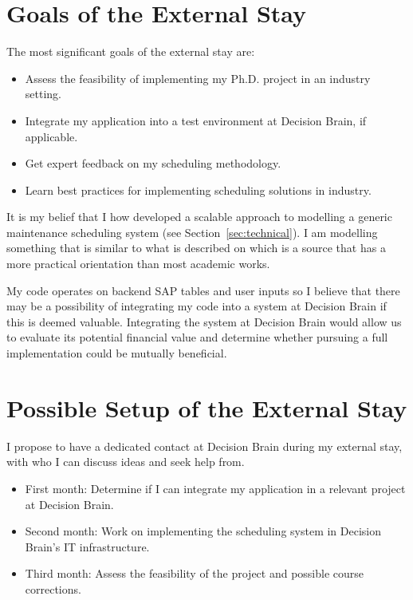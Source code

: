 \section*{Goals of the External Stay}
The most significant goals of the external stay are:

\begin{itemize}
	\item Assess the feasibility of implementing my Ph.D. project in an industry setting.
	\item Integrate my application into a test environment at Decision Brain, if applicable.
	\item Get expert feedback on my scheduling methodology. 
	\item Learn best practices for implementing scheduling solutions in industry.
\end{itemize}

It is my belief that I how developed a scalable approach to modelling a generic 
maintenance scheduling system (see Section~\ref{sec:technical}). I am 
modelling something that is similar to what is described on \cite{palmerMaintenancePlanningScheduling2019} 
which is a source that has a more practical orientation than most academic works. 

My code operates on backend SAP tables and user inputs so I believe that there may be a possibility of integrating my 
code into a system at Decision Brain if this is deemed valuable. Integrating the system at Decision 
Brain would allow us to evaluate its potential financial value and determine whether pursuing a
full implementation could be mutually beneficial.

\section*{Possible Setup of the External Stay}
I propose to have a dedicated contact at Decision Brain during my external stay, with who I can discuss ideas and seek help from.

\begin{itemize}
	\item First month: Determine if I can integrate my application in a relevant project at Decision Brain.
	\item Second month: Work on implementing the scheduling system in Decision Brain's IT infrastructure.
	\item Third month: Assess the feasibility of the project and possible course corrections.
\end{itemize}

